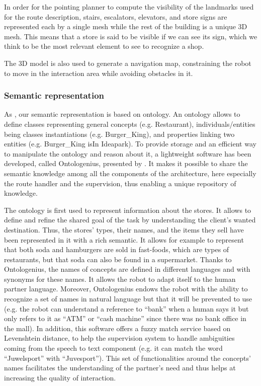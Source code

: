 \documentclass[a4paper,11pt,twoside]{StyleThese}
\begin{document}
In order for the pointing planner to compute the visibility of the landmarks used for the route description, stairs, escalators, elevators, and store signs are represented each by a single mesh while the rest of the building is a unique 3D mesh. This means that a store is said to be visible if we can see its sign, which we think to be the most relevant element to see to recognize a shop.

The 3D model is also used to generate a navigation map, constraining the robot to move in the interaction area while avoiding obstacles in it.

\subsubsection{Semantic representation}\label{subsubsec:semantic}

As \cite{satake_2015_field}, our semantic representation is based on ontology. An ontology allows to define classes representing general concepts (e.g. Restaurant), individuals/entities being classes instantiations (e.g. Burger\_King), and properties linking two entities (e.g. Burger\_King isIn Ideapark).
To provide storage and an efficient way to manipulate the ontology and reason about it, a lightweight software has been developed, called Ontologenius, presented by \cite{sarthou_2019_ontologenius}. It makes it possible to share the semantic knowledge among all the components of the architecture, here especially the route handler and the supervision, thus enabling a unique repository of knowledge.

The ontology is first used to represent information about the stores. It allows to define and refine the shared goal of the task by understanding the client's wanted destination. Thus, the stores' types, their names, and the items they sell have been represented in it with a rich semantic. It allows for example to represent that both soda and hamburgers are sold in fast-foods, which are types of restaurants, but that soda can also be found in a supermarket. Thanks to Ontologenius, the names of concepts are defined in different languages and with synonyms for these names. It allows the robot to adapt itself to the human partner language. Moreover, Ontologenius endows the robot with the ability to recognize a set of names in natural language but that it will be prevented to use (e.g. the robot can understand a reference to ``bank'' when a human says it but only refers to it as ``ATM'' or ``cash machine'' since there was no bank office in the mall). In addition, this software offers a fuzzy match service based on Levenshtein distance, to help the supervision system to handle ambiguities coming from the speech to text component (e.g. it can match the word ``Juwelsport'' with ``Juvesport''). This set of functionalities around the concepts' names facilitates the understanding of the partner's need and thus helps at increasing the quality of interaction.
\end{document}
